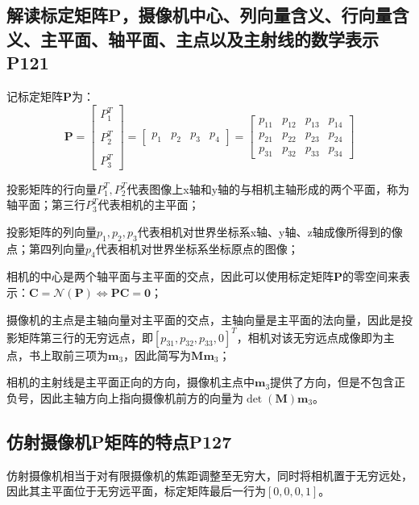 \documentclass[11pt]{article}
\begin{document}
\subsection{解读标定矩阵P，摄像机中心、列向量含义、行向量含义、主平面、轴平面、主点以及主射线的数学表示P121}
记标定矩阵$\mathbold{P}$为：
\begin{equation*}
  \mathbold{P}=\begin{bmatrix}
    P_1^T \\\\
    P_2^T \\\\
    P_3^T
  \end{bmatrix}
  =\begin{bmatrix}
    p_1 & p_2 & p_3 & p_4
  \end{bmatrix}=\begin{bmatrix}
    p_{11} & p_{12} & p_{13} & p_{14} \\
    p_{21} & p_{22} & p_{23} & p_{24} \\
    p_{31} & p_{32} & p_{33} & p_{34}
  \end{bmatrix}
\end{equation*}\par
投影矩阵的行向量$P_1^T,P_2^T$代表图像上x轴和y轴的与相机主轴形成的两个平面，称为轴平面；第三行$P_3^T$代表相机的主平面；\par
投影矩阵的列向量$p_1,p_2,p_3$代表相机对世界坐标系x轴、y轴、z轴成像所得到的像点；第四列向量$p_4$代表相机对世界坐标系坐标原点的图像；\par
相机的中心是两个轴平面与主平面的交点，因此可以使用标定矩阵$\mathbold{P}$的零空间来表示：$\mathbold{C}=\mathcal{N}(\mathbold{P})\Leftrightarrow\mathbf{PC=0}$；\par
摄像机的主点是主轴向量对主平面的交点，主轴向量是主平面的法向量，因此是投影矩阵第三行的无穷远点，即$[p_{31},p_{32},p_{33},0]^T$，相机对该无穷远点成像即为主点，书上取前三项为$\mathbf{m}_3$，因此简写为$\mathbold{Mm}_3$；\par
相机的主射线是主平面正向的方向，摄像机主点中$\mathbf{m}_3$提供了方向，但是不包含正负号，因此主轴方向上指向摄像机前方的向量为$\det(\mathbold{M})\mathbf{m}_3$。
\subsection{	仿射摄像机P矩阵的特点P127}
仿射摄像机相当于对有限摄像机的焦距调整至无穷大，同时将相机置于无穷远处，因此其主平面位于无穷远平面，标定矩阵最后一行为$[0,0,0,1]$。
\end{document}
